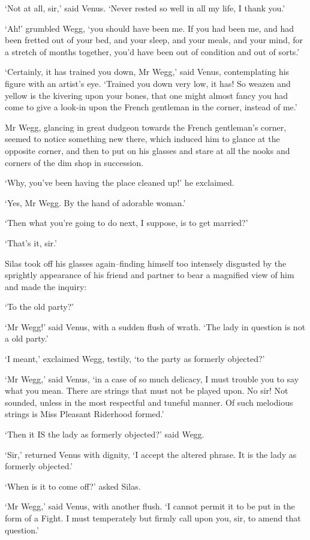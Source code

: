 ‘Not at all, sir,’ said Venus. ‘Never rested so well in all my life, I
thank you.’

‘Ah!’ grumbled Wegg, ‘you should have been me. If you had been me, and
had been fretted out of your bed, and your sleep, and your meals, and
your mind, for a stretch of months together, you’d have been out of
condition and out of sorts.’

‘Certainly, it has trained you down, Mr Wegg,’ said Venus, contemplating
his figure with an artist’s eye. ‘Trained you down very low, it has! So
weazen and yellow is the kivering upon your bones, that one might almost
fancy you had come to give a look-in upon the French gentleman in the
corner, instead of me.’

Mr Wegg, glancing in great dudgeon towards the French gentleman’s
corner, seemed to notice something new there, which induced him to
glance at the opposite corner, and then to put on his glasses and stare
at all the nooks and corners of the dim shop in succession.

‘Why, you’ve been having the place cleaned up!’ he exclaimed.

‘Yes, Mr Wegg. By the hand of adorable woman.’

‘Then what you’re going to do next, I suppose, is to get married?’

‘That’s it, sir.’

Silas took off his glasses again--finding himself too intensely
disgusted by the sprightly appearance of his friend and partner to bear
a magnified view of him and made the inquiry:

‘To the old party?’

‘Mr Wegg!’ said Venus, with a sudden flush of wrath. ‘The lady in
question is not a old party.’

‘I meant,’ exclaimed Wegg, testily, ‘to the party as formerly objected?’

‘Mr Wegg,’ said Venus, ‘in a case of so much delicacy, I must trouble
you to say what you mean. There are strings that must not be played
upon. No sir! Not sounded, unless in the most respectful and tuneful
manner. Of such melodious strings is Miss Pleasant Riderhood formed.’

‘Then it IS the lady as formerly objected?’ said Wegg.

‘Sir,’ returned Venus with dignity, ‘I accept the altered phrase. It is
the lady as formerly objected.’

‘When is it to come off?’ asked Silas.

‘Mr Wegg,’ said Venus, with another flush. ‘I cannot permit it to be
put in the form of a Fight. I must temperately but firmly call upon you,
sir, to amend that question.’

